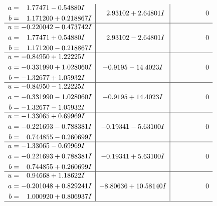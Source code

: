 \documentclass[1p]{elsarticle_modified}
\theoremstyle{definition}
\begin{document}
$$\begin{array}{c|c|c}
\begin{aligned}
a &= \phantom{-}1.77471 - 0.54880 I \\
b &= \phantom{-}1.171200 + 0.218867 I\end{aligned}
 & \phantom{-}2.93102 + 2.64801 I & \phantom{-0.000000 } 0 \\ \hline\begin{aligned}
u &= -0.220042 - 0.473742 I \\
a &= \phantom{-}1.77471 + 0.54880 I \\
b &= \phantom{-}1.171200 - 0.218867 I\end{aligned}
 & \phantom{-}2.93102 - 2.64801 I & \phantom{-0.000000 } 0 \\ \hline\begin{aligned}
u &= -0.84950 + 1.22225 I \\
a &= -0.331990 + 1.028060 I \\
b &= -1.32677 + 1.05932 I\end{aligned}
 & -0.9195 - 14.4023 I & \phantom{-0.000000 } 0 \\ \hline\begin{aligned}
u &= -0.84950 - 1.22225 I \\
a &= -0.331990 - 1.028060 I \\
b &= -1.32677 - 1.05932 I\end{aligned}
 & -0.9195 + 14.4023 I & \phantom{-0.000000 } 0 \\ \hline\begin{aligned}
u &= -1.33065 + 0.69969 I \\
a &= -0.221693 - 0.788381 I \\
b &= \phantom{-}0.744855 - 0.260699 I\end{aligned}
 & -0.19341 - 5.63100 I & \phantom{-0.000000 } 0 \\ \hline\begin{aligned}
u &= -1.33065 - 0.69969 I \\
a &= -0.221693 + 0.788381 I \\
b &= \phantom{-}0.744855 + 0.260699 I\end{aligned}
 & -0.19341 + 5.63100 I & \phantom{-0.000000 } 0 \\ \hline\begin{aligned}
u &= \phantom{-}0.94668 + 1.18622 I \\
a &= -0.201048 + 0.829241 I \\
b &= \phantom{-}1.000920 + 0.806937 I\end{aligned}
 & -8.80636 + 10.58140 I & \phantom{-0.000000 } 0\\
 \hline 
 \end{array}$$\newpage$$\begin{array}{c|c|c}  

\end{array}$$
\end{document}
